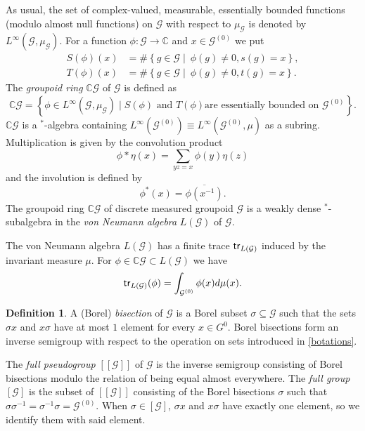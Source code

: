 \documentclass[a4paper,11pt]{article}
\numberwithin{equation}{section}
\theoremstyle{definition}
\newtheorem{defn}[thm]{Definition}
\theoremstyle{remark}
\numberwithin{equation}{section}
\newcommand{\rG}{\mathcal{G}}
\def\sub{\subseteq}
\def\trace{{\sf tr}}
\def\CC{\mathbb C}
\numberwithin{equation}{section}
\begin{document}
As usual, the set of complex-valued, measurable, essentially bounded 
functions (modulo almost null functions) 
on $\rG$ with respect to $\mu_\rG$ is denoted by 
$L^\infty (\rG,\mu_\rG)$. For a function $\phi:\rG\rightarrow\CC$ and 
$x\in\rG^{(0)}$ we put 
\begin{equation*}\begin{aligned}
S(\phi)(x)&=\#\left\{g\in\rG\mid ~\phi(g)\ne
  0,s(g)=x\right\},\\ 
T(\phi)(x)&=\#\left\{g\in\rG\mid~\phi(g)\ne
  0,t(g)=x\right\}.
\end{aligned}
\end{equation*}
The {\it groupoid ring} $\CC\rG$ of $\rG$ is defined as 
$$
\CC\rG=\left\{\phi\in L^\infty(\rG,\mu_\rG)\mid \text{$S(\phi)$ and $T(\phi)$
    are essentially bounded on $\rG^{(0)}$}\right\}.
$$
$\CC\rG$ is a $^*$-algebra containing 
$L^\infty(\rG^{(0)})\equiv L^\infty(\rG^{(0)},\mu)$ 
as a subring. Multiplication 
is given by the convolution product 
\begin{equation}
\phi*\eta(x)=\sum_{yz=x}\phi(y)\eta(z)
\end{equation}
and the involution is defined by 
\begin{equation}
\phi^*(x)=\overline{\phi(x^{-1})}.
\end{equation}
The groupoid ring $\CC\rG$ of discrete measured groupoid $\rG$ 
is a weakly dense $^*$-subalgebra in the {\it von Neumann algebra} $L(\rG)$ of $\rG$. 

The von Neumann algebra $L(\rG)$ has a finite trace
$\trace_{L(\rG)}$ induced by the invariant measure $\mu$. 
For $\phi\in\CC\rG\subset L(\rG)$ we have 
\begin{equation}
\trace_{L(\rG)}(\phi)=\int_{\rG^{(0)}}\phi(x)d\mu(x).
\end{equation}


\begin{defn}
  A (Borel) \textit{bisection} of $ \rG $ is a Borel subset $ \sigma\sub \rG $ such that the sets $ \sigma x $ and $ x\sigma $ have at most $ 1 $ element for every $ x\in G^{0} $. Borel bisections form an inverse semigroup with respect to the operation on sets introduced in \ref{botations}.
  
  
  The \textit{full pseudogroup} $ [[\rG]] $ of $ \rG $ is the inverse semigroup consisting of Borel bisections modulo the relation of being equal almost everywhere. The \textit{full group} $ [\rG] $ is the subset of $ [[\rG]] $ consisting of the Borel bisections $ \sigma $ such that $ \sigma\sigma^{-1} = \sigma^{-1}\sigma = \rG^{(0)} $. When $\sigma\in [\rG]$, $ \sigma x $ and $ x\sigma $ have exactly one element, so we identify them with said element.
\end{defn}
\end{document}
